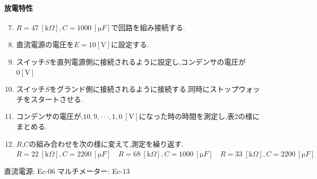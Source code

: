 \documentclass[uplatex]{jsarticle}
\begin{document}
			\paragraph{放電特性}
			\begin{enumerate}
				\setcounter{enumi}{6}
				\item{$R = 47 \ [\mathrm k \Omega], C = 1000 \ [\mathrm \mu F]$で回路を組み接続する.}
				\item{直流電源の電圧を$E = 10 [\mathrm V]$に設定する.}
				\item{スイッチ$S$を直列電源側に接続されるように設定し,コンデンサの電圧が$0 [\mathrm V]$}
				\item{スイッチ$S$をグランド側に接続されるように接続する.同時にストップウォッチをスタートさせる.}
				\item{コンデンサの電圧が,$10,9,\cdot\cdot\cdot,1,0 \ [\mathrm V]$になった時の時間を測定し,表2の様にまとめる.}
				\item{$R$,$C$の組み合わせを次の様に変えて,測定を繰り返す.\\
					$R = 22 \ [\mathrm k \Omega], C = 2200 \ [\mathrm \mu F] \quad R = 68 \ [\mathrm k \Omega], C = 1000 \ [\mathrm \mu F] \quad R = 33 \ [\mathrm k \Omega], C = 2200 \ [\mathrm \mu F]$}
			\end{enumerate}
			直流電源: Ec-06 \quad マルチメーター: Ec-13
\end{document}

